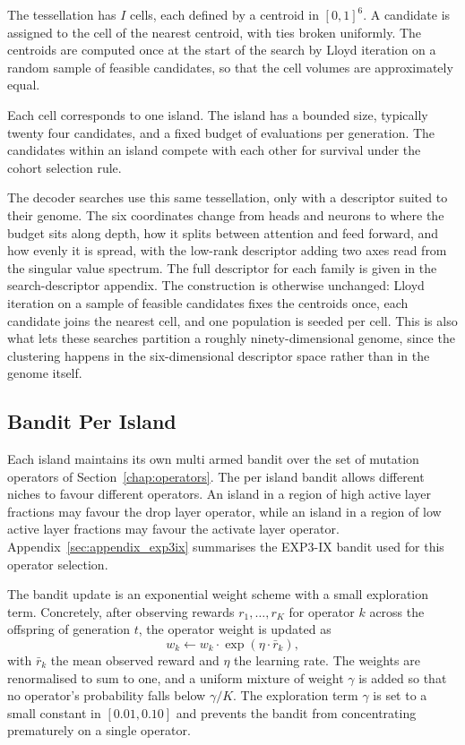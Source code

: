 The tessellation has $I$ cells, each defined by a centroid in $[0,1]^6$. A candidate is assigned to the cell of the nearest centroid, with ties broken uniformly. The centroids are computed once at the start of the search by Lloyd iteration on a random sample of feasible candidates, so that the cell volumes are approximately equal.

Each cell corresponds to one island. The island has a bounded size, typically twenty four candidates, and a fixed budget of evaluations per generation. The candidates within an island compete with each other for survival under the cohort selection rule.

The decoder searches use this same tessellation, only with a descriptor suited to their genome. The six coordinates change from heads and neurons to where the budget sits along depth, how it splits between attention and feed forward, and how evenly it is spread, with the low-rank descriptor adding two axes read from the singular value spectrum. The full descriptor for each family is given in the search-descriptor appendix. The construction is otherwise unchanged: Lloyd iteration on a sample of feasible candidates fixes the centroids once, each candidate joins the nearest cell, and one population is seeded per cell. This is also what lets these searches partition a roughly ninety-dimensional genome, since the clustering happens in the six-dimensional descriptor space rather than in the genome itself.

\subsection{Bandit Per Island}

Each island maintains its own multi armed bandit over the set of mutation operators of Section~\ref{chap:operators}. The per island bandit allows different niches to favour different operators. An island in a region of high active layer fractions may favour the drop layer operator, while an island in a region of low active layer fractions may favour the activate layer operator. Appendix~\ref{sec:appendix_exp3ix} summarises the EXP3-IX bandit used for this operator selection.

The bandit update is an exponential weight scheme with a small exploration term. Concretely, after observing rewards $r_1, \ldots, r_K$ for operator $k$ across the offspring of generation $t$, the operator weight is updated as
\begin{equation}
w_k \leftarrow w_k \cdot \exp(\eta \cdot \bar r_k),
\end{equation}
with $\bar r_k$ the mean observed reward and $\eta$ the learning rate. The weights are renormalised to sum to one, and a uniform mixture of weight $\gamma$ is added so that no operator's probability falls below $\gamma / K$. The exploration term $\gamma$ is set to a small constant in $[0.01, 0.10]$ and prevents the bandit from concentrating prematurely on a single operator.

